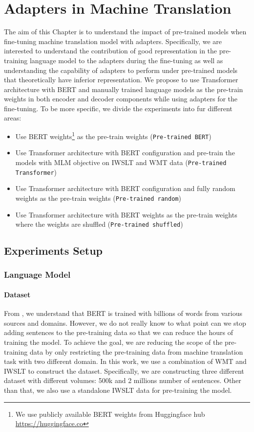 
\chapter{Adapters in Machine Translation}
\label{chap:adaptmt}
The aim of this Chapter is to understand the impact of pre-trained models when fine-tuning machine translation model with adapters. Specifically, we are interested to understand the contribution of good representation in the pre-training language model to the adapters during the fine-tuning as well as understanding the capability of adapters to perform under pre-trained models that theoretically have inferior representation. We propose to use Transformer architecture with BERT and manually trained language models as the pre-train weights in both encoder and decoder components while using adapters for the fine-tuning. To be more specific, we divide the experiments into fur different areas:
\begin{itemize}
    \item Use BERT weights\footnote{We use publicly available BERT weights from Huggingface hub \url{https://huggingface.co}} as the pre-train weights (\texttt{Pre-trained BERT})
    \item Use Transformer architecture with BERT configuration and pre-train the models with MLM objective on IWSLT and WMT data (\texttt{Pre-trained Transformer})
    \item Use Transformer architecture with BERT configuration and fully random weights as the pre-train weights (\texttt{Pre-trained random})
    \item Use Transformer architecture with BERT weights as the pre-train weights where the weights are shuffled (\texttt{Pre-trained shuffled})
\end{itemize}

\section{Experiments Setup}
\subsection{Language Model}
\label{ssec:langmodel}
\subsubsection{Dataset}
From \cite{devlin2018bert}, we understand that BERT is trained with billions of words from various sources and domains. However, we do not really know to what point can we stop adding sentences to the pre-training data so that we can reduce the hours of training the model. To achieve the goal, we are reducing the scope of the pre-training data by only restricting the pre-training data from machine translation task with two different domain. In this work, we use a combination of WMT and IWSLT to construct the dataset. Specifically, we are constructing three different dataset with different volumes: 500k and 2 millions number of sentences. Other than that, we also use a standalone IWSLT data for pre-training the model.


